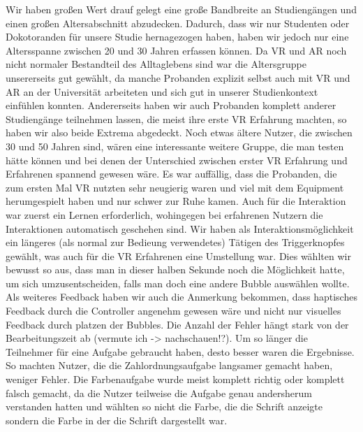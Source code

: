 Wir haben großen Wert drauf gelegt eine große Bandbreite an Studiengängen und einen großen Altersabschnitt abzudecken. Dadurch, dass wir nur Studenten oder Dokotoranden für unsere Studie hernagezogen haben, haben wir jedoch nur eine Altersspanne zwischen 20 und 30 Jahren erfassen können. Da VR und AR noch nicht normaler Bestandteil des Alltaglebens sind war die Altersgruppe unsererseits gut gewählt, da manche Probanden explizit selbst auch mit VR und AR an der Universität arbeiteten und sich gut in unserer Studienkontext einfühlen konnten. Andererseits haben wir auch Probanden komplett anderer Studiengänge teilnehmen lassen, die meist ihre erste VR Erfahrung machten, so haben wir also beide Extrema abgedeckt. Noch etwas ältere Nutzer, die zwischen 30 und 50 Jahren sind, wären eine interessante weitere Gruppe, die man testen hätte können und bei denen der Unterschied zwischen erster VR Erfahrung und Erfahrenen spannend gewesen wäre. 
Es war auffällig, dass die Probanden, die zum ersten Mal VR nutzten sehr neugierig waren und viel mit dem Equipment herumgespielt haben und nur schwer zur Ruhe kamen. Auch für die Interaktion war zuerst ein Lernen erforderlich, wohingegen bei erfahrenen Nutzern die Interaktionen automatisch geschehen sind. Wir haben als Interaktionsmöglichkeit ein längeres (als normal zur Bedieung verwendetes) Tätigen des Triggerknopfes gewählt, was auch für die VR Erfahrenen eine Umstellung war. Dies wählten wir bewusst so aus, dass man in dieser halben Sekunde noch die Möglichkeit hatte, um sich umzusentscheiden, falls man doch eine andere Bubble auswählen wollte. Als weiteres Feedback haben wir auch die Anmerkung bekommen, dass haptisches Feedback durch die Controller angenehm gewesen wäre und nicht nur visuelles Feedback durch platzen der Bubbles.
Die Anzahl der Fehler hängt stark von der Bearbeitungszeit ab (vermute ich -> nachschauen!?). Um so länger die Teilnehmer für eine Aufgabe gebraucht haben, desto besser waren die Ergebnisse. So machten Nutzer, die die Zahlordnungsaufgabe langsamer gemacht haben, weniger Fehler. Die Farbenaufgabe wurde meist komplett richtig oder komplett falsch gemacht, da die Nutzer teilweise die Aufgabe genau andersherum verstanden hatten und wählten so nicht die Farbe, die die Schrift anzeigte sondern die Farbe in der die Schrift dargestellt war.
